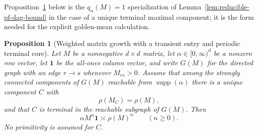 \documentclass{etds}%
\numberwithin{equation}{section}
\theoremstyle{plain}
\newtheorem{proposition}[theorem]{Proposition}
\theoremstyle{definition}
\theoremstyle{remark}
\begin{document}
\noindent
Proposition~\ref{prop:weighted-matrix-transient-core} below is the
$q_\alpha(M)=1$ specialization of
Lemma~\ref{lem:reducible-pf-dag-bound} in the case of a unique terminal
maximal component; it is the form needed for the explicit golden-mean
calculation.

\begin{proposition}[Weighted matrix growth with a transient entry and periodic terminal core]
\label{prop:weighted-matrix-transient-core}
Let $M$ be a nonnegative $d\times d$ matrix, let $\alpha\in[0,\infty)^d$ be a
nonzero row vector, let $\mathbf{1}$ be the all-ones column vector, and write
$G(M)$ for the directed graph with an edge $r\to s$ whenever $M_{rs}>0$.
Assume that among the strongly connected components of $G(M)$ reachable from
$\operatorname{supp}(\alpha)$ there is a unique component $C$ with
\[
\rho(M_C)=\rho(M),
\]
and that $C$ is terminal in the reachable subgraph of $G(M)$.  Then
\[
\alpha M^n\mathbf{1}\asymp \rho(M)^n
\qquad(n\ge 0).
\]
No primitivity is assumed for $C$.
\end{proposition}
\end{document}
